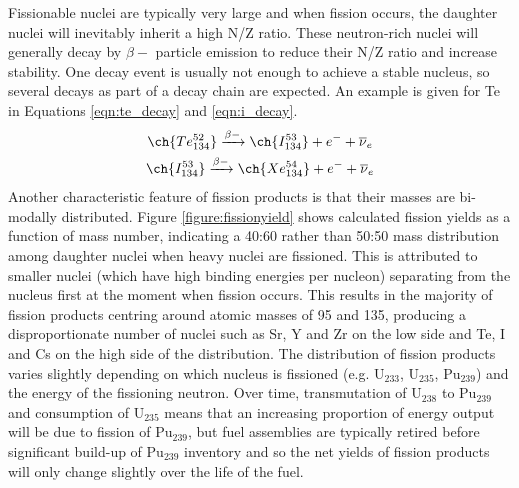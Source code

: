Fissionable nuclei are typically very large and when fission occurs, the daughter nuclei will inevitably inherit a high N/Z ratio. These neutron-rich nuclei will generally decay by $\beta-$ particle emission to reduce their N/Z ratio and increase stability. One decay event is usually not enough to achieve a stable nucleus, so several decays as part of a decay chain are expected. An example is given for Te in Equations \ref{eqn:te_decay} and \ref{eqn:i_decay}.
\begin{gather}
\ch{Te_{134}^{52}} \xrightarrow[]{\beta-} \ch{I_{134}^{53}}+ e^{-} + \overline{\nu}_{e}
\label{eqn:te_decay} \\
\ch{I_{134}^{53}} \xrightarrow[]{\beta-} \ch{Xe_{134}^{54}} + e^{-} + \overline{\nu}_{e}
\label{eqn:i_decay}
\end{gather}
Another characteristic feature of fission products is that their masses are bi-modally distributed. Figure \ref{figure:fissionyield} shows calculated fission yields as a function of mass number, indicating a 40:60 rather than 50:50 mass distribution among daughter nuclei when heavy nuclei are fissioned. This is attributed to smaller nuclei (which have high binding energies per nucleon) separating from the nucleus first at the moment when fission occurs. This results in the majority of fission products centring around atomic masses of 95 and 135, producing a disproportionate number of nuclei such as Sr, Y and Zr on the low side and Te, I and Cs on the high side of the distribution. The distribution of fission products varies slightly depending on which nucleus is fissioned (e.g. U$_{233}$, U$_{235}$, Pu$_{239}$) and the energy of the fissioning neutron. Over time, transmutation of U$_{238}$ to Pu$_{239}$ and consumption of U$_{235}$ means that an increasing proportion of energy output will be due to fission of Pu$_{239}$, but fuel assemblies are typically retired before significant build-up of Pu$_{239}$ inventory and so the net yields of fission products will only change slightly over the life of the fuel.

